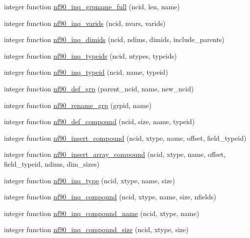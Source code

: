 \begin{DoxyCompactItemize}
integer function \hyperlink{netcdf4__func_8f90_a336d772c3bcd96d159a81664ca3c3f80}{nf90\+\_\+inq\+\_\+grpname\+\_\+full} (ncid, len, name)
\item 
integer function \hyperlink{netcdf4__func_8f90_ac2c9c6c8208c29cdc169469285ddb090}{nf90\+\_\+inq\+\_\+varids} (ncid, nvars, varids)
\item 
integer function \hyperlink{netcdf4__func_8f90_a7caba349a754de65fab0f407cfb8f762}{nf90\+\_\+inq\+\_\+dimids} (ncid, ndims, dimids, include\+\_\+parents)
\item 
integer function \hyperlink{netcdf4__func_8f90_a2bdbb694c367a100f148c2fe7123703b}{nf90\+\_\+inq\+\_\+typeids} (ncid, ntypes, typeids)
\item 
integer function \hyperlink{netcdf4__func_8f90_a46fdff0d53554ba5693372dc94ce3227}{nf90\+\_\+inq\+\_\+typeid} (ncid, name, typeid)
\item 
integer function \hyperlink{netcdf4__func_8f90_a183abbd603d7ab7468178b26da33de37}{nf90\+\_\+def\+\_\+grp} (parent\+\_\+ncid, name, new\+\_\+ncid)
\item 
integer function \hyperlink{netcdf4__func_8f90_a8d795381e7888daee2428ba0c29591d0}{nf90\+\_\+rename\+\_\+grp} (grpid, name)
\item 
integer function \hyperlink{netcdf4__func_8f90_a2d544d86e4e40b8863363dde6c5e14b8}{nf90\+\_\+def\+\_\+compound} (ncid, size, name, typeid)
\item 
integer function \hyperlink{netcdf4__func_8f90_a13e3b98b17ffbd4daac7142f28b240ad}{nf90\+\_\+insert\+\_\+compound} (ncid, xtype, name, offset, field\+\_\+typeid)
\item 
integer function \hyperlink{netcdf4__func_8f90_ae8759e28f6853cbc7a0d13ed690e3177}{nf90\+\_\+insert\+\_\+array\+\_\+compound} (ncid, xtype, name, offset, field\+\_\+typeid, ndims, dim\+\_\+sizes)
\item 
integer function \hyperlink{netcdf4__func_8f90_a92be7253c3e9244ba23d37863ccfedb1}{nf90\+\_\+inq\+\_\+type} (ncid, xtype, name, size)
\item 
integer function \hyperlink{netcdf4__func_8f90_ad9d17092e17308011195527cf58dc8a0}{nf90\+\_\+inq\+\_\+compound} (ncid, xtype, name, size, nfields)
\item 
integer function \hyperlink{netcdf4__func_8f90_a475d80b3bf193d3406062506c8f660ab}{nf90\+\_\+inq\+\_\+compound\+\_\+name} (ncid, xtype, name)
\item 
integer function \hyperlink{netcdf4__func_8f90_ac7d2aa6aae07ec2e3a1342ec9ef11df5}{nf90\+\_\+inq\+\_\+compound\+\_\+size} (ncid, xtype, size)

\end{DoxyCompactItemize}
